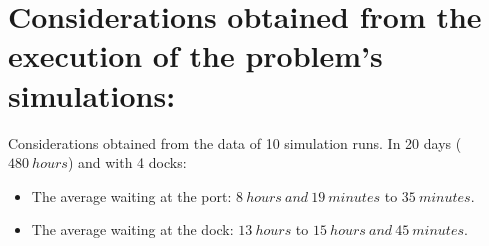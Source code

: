 \documentclass{llncs}
\begin{document}
\section{Considerations obtained from the execution of the problem's simulations:}
Considerations obtained from the data of 10 simulation runs. In 20 days ($480~hours$) and with 4 docks:
\begin{itemize}
	\item The average waiting at the port: $8~hours~and~19~minutes$ to $35~minutes$.
	\item The average waiting at the dock: $13~hours$ to $15~hours~and~45~minutes$.
\end{itemize}
\end{document}

